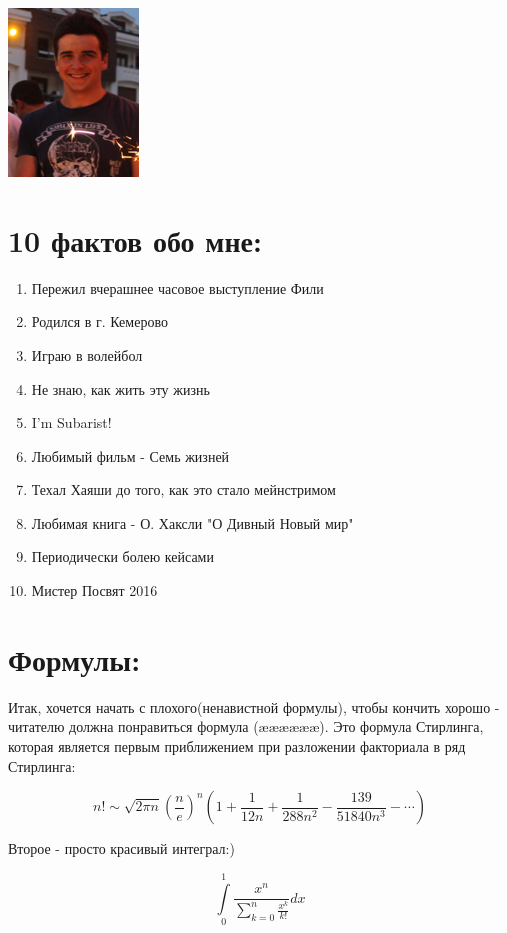 \documentclass[12pt, a4paper]{article}
\begin{document}

\includegraphics[scale=1.5]{HW1.png}	

\section*{10 фактов обо мне:}
\begin{enumerate}
	\item Пережил вчерашнее часовое выступление Фили
	\item Родился в г. Кемерово
	\item Играю в волейбол
	\item Не знаю, как жить эту жизнь
	\item I'm Subarist!
	\item Любимый фильм - Семь жизней
	\item Техал Хаяши до того, как это стало мейнстримом
	\item Любимая книга - О. Хаксли "О Дивный Новый мир"
	\item Периодически болею кейсами
	\item Мистер Посвят 2016
\end{enumerate}

\section*{Формулы:}
Итак, хочется начать с плохого(ненавистной формулы), чтобы кончить хорошо - читателю должна понравиться формула (\ae\ae\ae\ae\ae\ae). Это формула Стирлинга, которая является первым приближением при разложении факториала в ряд Стирлинга:

\begin{equation}
n! \sim \sqrt{2\pi n}\left(\frac{n}{e}\right)^n\left(1+\frac{1}{12n}+\frac{1}{288n^2}-\frac{139}{51840n^3}-\cdots \right)
\tag{\ae}
\end{equation}

Второе - просто красивый интеграл:)

\begin{equation}
\int\limits_{0}^{1}{\frac{{{x}^{n}}}{\sum\limits_{k=0}^{n}{\frac{{{x}^{k}}}{k!}}}dx}
\tag{\ae\ae}
\end{equation}
\end{document}
